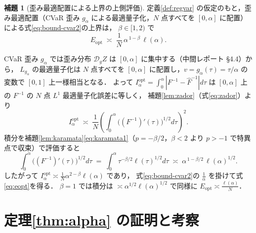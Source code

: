 \documentclass[a4paper,10pt]{jsarticle}
\makeatletter
\theoremstyle{definition}
\newtheorem{lemma}{補題}[section]
\renewenvironment{proof}[1][\proofname]{\par
  \pushQED{\qed}%
  \normalfont \topsep6\p@\@plus6\p@\relax
  \trivlist
  \item[\hskip\labelsep\textbf{#1}]\ignorespaces
}{%
  \popQED\endtrivlist\@endpefalse
}
\renewcommand{\proofname}{証明}
\newcommand{\Finv}{F^{-1}}
\newcommand{\Fhinv}{\hat{F}^{-1}}
\newcommand{\dist}{\mathcal{D}_g}
\makeatother
\begin{document}
\begin{lemma}[歪み最適配置による上界の上側評価]
\label{lem:opt}
定義\ref{def:regvar} の仮定のもと，歪み最適配置（CVaR 歪み $g_\alpha$ による最適量子化，$N$ 点すべてを $[0,\alpha]$ に配置）による式\eqref{eq:bound-cvar2}の上界は，
$\beta\in[1,2)$ で
\begin{equation}
  E_{\mathrm{opt}}\;\asymp\;\frac1N\,\alpha^{\,1-\beta}\,\ell(\alpha).
  \label{eq:eopt}
\end{equation}
\end{lemma}
\begin{proof}
CVaR 歪み $g_\alpha$ では歪み分布 $\dist Z$ は $[0,\alpha]$ に集中する（中間レポート §4.4）から，
$L_{g_\alpha}$ の最適量子化は $N$ 点すべてを $[0,\alpha]$ に配置し，$v=g_\alpha(\tau)=\tau/\alpha$ の変数で $[0,1]$ 上一様相当となる．
よって $I_\alpha^{\mathrm{opt}}=\int_0^\alpha|\Finv-\Fhinv|d\tau$ は $[0,\alpha]$ 上の $\Finv$ の $N$ 点 $L^1$ 最適量子化誤差に等しく，
補題\ref{lem:zador}（式\eqref{eq:zador}）より
\begin{equation*}
I_\alpha^{\mathrm{opt}}\;\asymp\;\frac1N\left(\int_0^\alpha\bigl((\Finv)'(\tau)\bigr)^{1/2}d\tau\right)^{2}.
\end{equation*}
積分を補題\ref{lem:karamata}\eqref{eq:karamata1}（$p=-\beta/2$，$\beta<2$ より $p>-1$ で特異点で収束）で評価すると
\begin{equation*}
\int_0^\alpha\bigl((\Finv)'(\tau)\bigr)^{1/2}d\tau
\;=\;\int_0^\alpha\tau^{-\beta/2}\ell(\tau)^{1/2}d\tau
\;\asymp\;\alpha^{\,1-\beta/2}\,\ell(\alpha)^{1/2}.
\end{equation*}
したがって $I_\alpha^{\mathrm{opt}}\asymp\frac1N\alpha^{2-\beta}\ell(\alpha)$ であり，
式\eqref{eq:bound-cvar2}の $\frac1\alpha$ を掛けて式\eqref{eq:eopt}を得る．
$\beta=1$ では積分は $\asymp\alpha^{1/2}\ell(\alpha)^{1/2}$ で同様に $E_{\mathrm{opt}}\asymp\frac{\ell(\alpha)}{N}$．
\end{proof}

\section{定理\ref{thm:alpha} の証明と考察}
\end{document}
